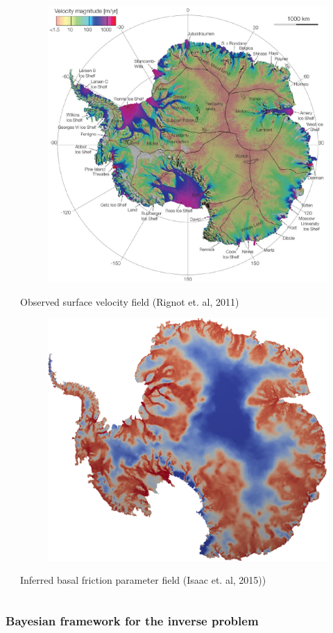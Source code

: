 \documentclass{beamer}
\begin{document}
\begin{frame}
\begin{columns}
\begin{column}{0.55\textwidth}
    \end{column}
    \begin{column}{0.45\textwidth}
      \begin{figure}
        \centering
        \includegraphics[width=0.5\columnwidth]{figures/ScienceRignot-crop.pdf}
      \end{figure}
      \vspace{-0.5cm}
      \begin{center}
        {\tiny Observed surface velocity field (Rignot et. al, 2011)}
      \end{center}
      \begin{figure}
        \centering
        \includegraphics[width=0.4\columnwidth]{figures/antarctica_beta.png}
      \end{figure}
      \begin{center}
        {\tiny Inferred basal friction parameter field (Isaac et. al, 2015))}
      \end{center}
    \end{column}
  \end{columns}
\end{frame}

\begin{frame}
  \frametitle{Bayesian framework for the inverse problem}

  \begin{center}
    
  \end{center}
\end{frame}
\end{document}
